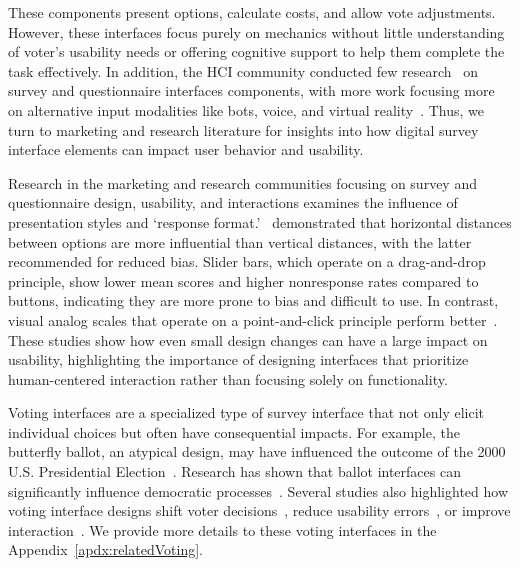 These components present options, calculate costs, and allow vote adjustments. However, these interfaces focus purely on mechanics without little understanding of voter's usability needs or offering cognitive support to help them complete the task effectively. In addition, the HCI community conducted few research~\cite{nobarany2012design, van2007design} on survey and questionnaire interfaces components, with more work focusing more on alternative input modalities like bots, voice, and virtual reality~\cite{voiceWei2022, khullar2021, kimComparingDataChatbot2019, feick2020virtual}. Thus, we turn to marketing and research literature for insights into how digital survey interface elements can impact user behavior and usability.

Research in the marketing and research communities focusing on survey and questionnaire design, usability, and interactions examines the influence of presentation styles and `response format.'~\textcite{weijtersExtremityHorizontalVertical2021} demonstrated that horizontal distances between options are more influential than vertical distances, with the latter recommended for reduced bias. Slider bars, which operate on a drag-and-drop principle, show lower mean scores and higher nonresponse rates compared to buttons, indicating they are more prone to bias and difficult to use. In contrast, visual analog scales that operate on a point-and-click principle perform better~\cite{toepoelSlidersVisualAnalogue2018}. These studies show how even small design changes can have a large impact on usability, highlighting the importance of designing interfaces that prioritize human-centered interaction rather than focusing solely on functionality.

Voting interfaces are a specialized type of survey interface that not only elicit individual choices but often have consequential impacts. For example, the butterfly ballot, an atypical design, may have influenced the outcome of the 2000 U.S. Presidential Election~\cite{wandButterflyDidIt2001}. Research has shown that ballot interfaces can significantly influence democratic processes~\cite{engstrom2020politics, chisnellDemocracyDesignProblem2016, DesigningUsableBallots2015}. Several studies also highlighted how voting interface designs shift voter decisions~\cite{engstrom2020politics}, reduce usability errors~\cite{quesenberyOpinionGoodDesign2020, everettElectronicVotingMachines2008}, or improve interaction~\cite{leeUniversalDesignBallot2016, summers2014making, dawkinsPrimeIIIInnovative2009, gilbertAnomalyDetectionElectronic2013, conradElectronicVotingEliminates2009}. We provide more details to these voting interfaces in the Appendix~\ref{apdx:relatedVoting}.

